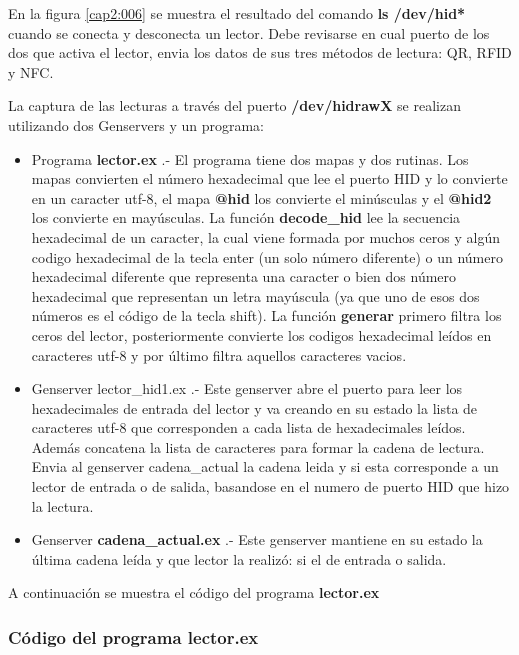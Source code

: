 En la figura \ref{cap2:006} se muestra el resultado del comando \textbf{ls /dev/hid*} cuando se conecta y desconecta un lector. Debe revisarse en cual puerto de los dos que activa el lector, envia los datos de sus tres métodos de lectura: QR, RFID y NFC.

La captura de las lecturas a través del puerto \textbf{/dev/hidrawX} se realizan utilizando dos Genservers y un programa: 

\begin{itemize}
\item Programa \textbf{lector.ex} .- El programa tiene dos mapas y dos rutinas. Los mapas convierten el número hexadecimal que lee el puerto HID y lo convierte en un caracter utf-8, el mapa \textbf{@hid} los convierte el minúsculas y el \textbf{@hid2} los convierte en mayúsculas. La función \textbf{decode\_hid} lee la secuencia hexadecimal de un caracter, la cual viene formada por muchos ceros y algún codigo hexadecimal de la tecla enter (un solo número diferente) o un número hexadecimal diferente que representa una caracter o bien dos número hexadecimal que representan un letra mayúscula (ya que uno de esos dos números es el código de la tecla shift). La función \textbf{generar} primero filtra los ceros del lector, posteriormente convierte los codigos hexadecimal leídos en caracteres utf-8 y por último filtra aquellos caracteres vacios.
\item Genserver lector\_hid1.ex .- Este genserver abre el puerto para leer los hexadecimales de entrada del lector y va creando en su estado la lista de caracteres utf-8 que corresponden a cada lista de hexadecimales leídos. Además concatena la lista de caracteres para formar la cadena de lectura. Envia al genserver cadena\_actual la cadena leida y si esta corresponde a un lector de entrada o de salida, basandose en el numero de puerto HID que hizo la lectura.
\item Genserver \textbf{cadena\_actual.ex} .- Este genserver mantiene en su estado la última cadena leída y que lector la realizó: si el de entrada o salida.
\end{itemize}

A continuación se muestra el código del programa \textbf{lector.ex}

\subsubsection{Código del programa lector.ex}

